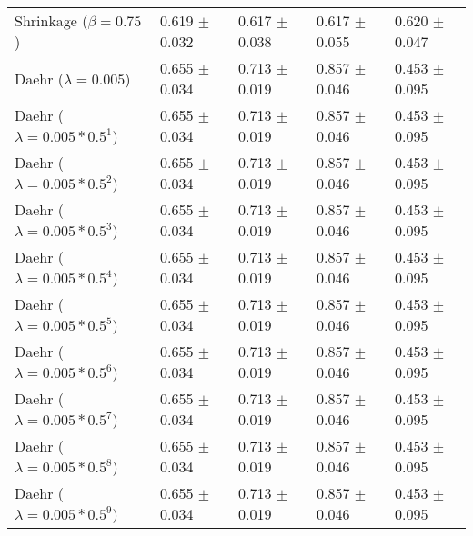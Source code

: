 \begin{table}
\begin{tabular}{*{5}{l}}
Shrinkage ($\beta=0.75$)&0.619 $\pm$ 0.032&0.617 $\pm$ 0.038&0.617 $\pm$ 0.055&0.620 $\pm$ 0.047\\
Daehr ($\lambda=0.005$)&0.655 $\pm$ 0.034&0.713 $\pm$ 0.019&0.857 $\pm$ 0.046&0.453 $\pm$ 0.095\\
Daehr ($\lambda=0.005*0.5^1$)&0.655 $\pm$ 0.034&0.713 $\pm$ 0.019&0.857 $\pm$ 0.046&0.453 $\pm$ 0.095\\
Daehr ($\lambda=0.005*0.5^2$)&0.655 $\pm$ 0.034&0.713 $\pm$ 0.019&0.857 $\pm$ 0.046&0.453 $\pm$ 0.095\\
Daehr ($\lambda=0.005*0.5^3$)&0.655 $\pm$ 0.034&0.713 $\pm$ 0.019&0.857 $\pm$ 0.046&0.453 $\pm$ 0.095\\
Daehr ($\lambda=0.005*0.5^4$)&0.655 $\pm$ 0.034&0.713 $\pm$ 0.019&0.857 $\pm$ 0.046&0.453 $\pm$ 0.095\\
Daehr ($\lambda=0.005*0.5^5$)&0.655 $\pm$ 0.034&0.713 $\pm$ 0.019&0.857 $\pm$ 0.046&0.453 $\pm$ 0.095\\
Daehr ($\lambda=0.005*0.5^6$)&0.655 $\pm$ 0.034&0.713 $\pm$ 0.019&0.857 $\pm$ 0.046&0.453 $\pm$ 0.095\\
Daehr ($\lambda=0.005*0.5^7$)&0.655 $\pm$ 0.034&0.713 $\pm$ 0.019&0.857 $\pm$ 0.046&0.453 $\pm$ 0.095\\
Daehr ($\lambda=0.005*0.5^8$)&0.655 $\pm$ 0.034&0.713 $\pm$ 0.019&0.857 $\pm$ 0.046&0.453 $\pm$ 0.095\\
Daehr ($\lambda=0.005*0.5^9$)&0.655 $\pm$ 0.034&0.713 $\pm$ 0.019&0.857 $\pm$ 0.046&0.453 $\pm$ 0.095\\
\bottomrule
\end{tabular}
\end{table}


